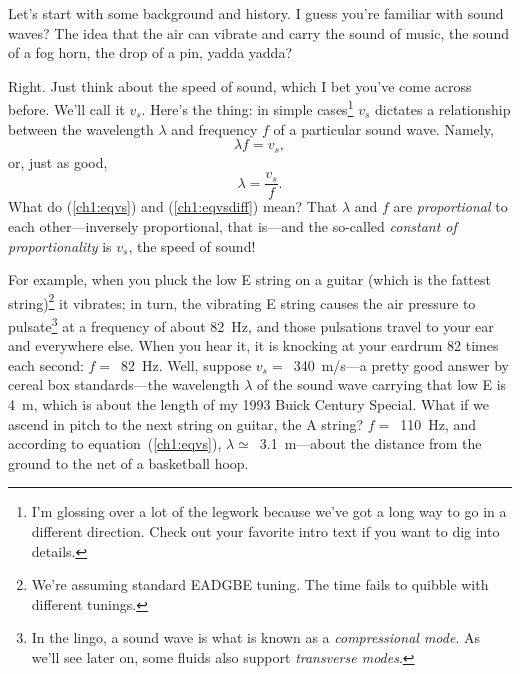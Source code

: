 






Let's start with some background and history. I guess you're familiar with sound
waves? The idea that the air can vibrate and carry the sound of music, the sound
of a fog horn, the drop of a pin, yadda yadda?

Right. Just think about the speed of sound, which I bet you've come across
before. We'll call it $v_s$. Here's the thing: in simple cases\footnote{I'm
  glossing over a lot of the legwork because we've got a long way to go in a
  different direction. Check out your favorite intro text if you want to dig
  into details.}  $v_s$ dictates a relationship between the wavelength $\lambda$
and frequency $f$ of a particular sound wave. Namely,
\begin{equation}
  \label{ch1:eqvs}
  \lambda f = v_s,
\end{equation}
or, just as good,
\begin{equation}
  \label{ch1:eqvsdiff}
  \lambda = \dfrac{v_s}{f}.
\end{equation}
What do (\ref{ch1:eqvs}) and (\ref{ch1:eqvsdiff}) mean? That $\lambda$ and $f$
are \emph{proportional} to each other---inversely proportional, that is---and
the so-called \emph{constant of proportionality} is $v_s$, the speed of
sound!

For example, when you pluck the low E string on a guitar (which is the fattest
string)\footnote{We're assuming standard EADGBE tuning. The time fails to
  quibble with different tunings.} it vibrates; in turn, the vibrating E string
causes the air pressure to pulsate\footnote{In the lingo, a sound wave is what
  is known as a \emph{compressional mode}. As we'll see later on, some fluids
  also support \emph{transverse modes}.} at a frequency of about 82~Hz, and
those pulsations travel to your ear and everywhere else. When you hear it, it is
knocking at your eardrum 82 times each second: $f = $~82~Hz.  Well, suppose
$v_s =$~340~m/s---a pretty good answer by cereal box standards---the wavelength
$\lambda$ of the sound wave carrying that low E is 4~m, which is about the
length of my 1993 Buick Century Special. What if we ascend in pitch to the
next string on guitar, the A string?  $f = $~110~Hz, and according to
equation~(\ref{ch1:eqvs}), $\lambda \simeq$~3.1~m---about the distance from the
ground to the net of a basketball hoop.

